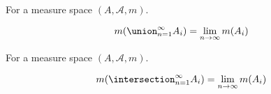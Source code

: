 \begin{prop}
  For a measure space $(A, \mathcal{A}, m)$.

  $$
    m(\union_{n = 1}^{\infty} A_i) = \lim_{n \to \infty} m(A_i)
  $$
\end{prop}

\begin{prop}
  For a measure space $(A, \mathcal{A}, m)$.

  $$
    m(\intersection_{n = 1}^{\infty} A_i) = \lim_{n \to \infty} m(A_i)
  $$
\end{prop}


\begin{expl}
\end{expl}

\strats
